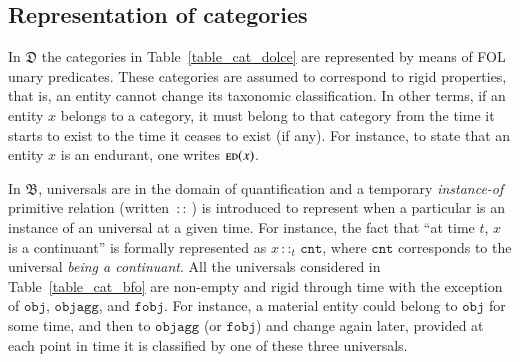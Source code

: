\documentclass[ao]{iosart2x}
\newcommand{\nb}[1]{\textcolor{red}{$|$}\marginpar{\hspace*{-0cm}\parbox{20mm}{\scriptsize\raggedright\textcolor{red}{#1}}}}
\newcommand{\cn}[1]{\mathtt{#1}}
\newcommand {\thdolce} {\ensuremath{\mathfrak{D}}}
\newcommand {\thbfo} {\ensuremath{\mathfrak{B}}}
\newcommand {\EDdcat} {\textsc{ed}}
\newcommand{\cntbcat}{\cn{cnt}}
\newcommand{\objbcat}{\cn{obj}}
\newcommand{\fobjbcat}{\cn{fobj}}
\newcommand{\objaggbcat}{\cn{objagg}}
\newcommand{\bfoiof}[1]{{\,::_{#1\:\!}}}
\begin{document}
\subsection{Representation of categories}\label{sect_problem_univ}

In  {$\thdolce$} the categories in  Table~\ref{table_cat_dolce} are represented by means of FOL unary predicates. These categories are assumed to correspond to rigid properties, that is, an entity cannot change its taxonomic classification. In other terms, if an entity $x$ belongs to a category, it must belong to that category from the time it starts to exist to the time it ceases to exist (if any). For instance, to state that an entity $x$ is an endurant, one writes $\EDdcat(x)$.  

In {$\thbfo$}, universals are in the domain of quantification and a temporary \emph{instance-of} primitive relation (written $\bfoiof{}$) is introduced to represent when a particular is an instance of an universal at a given time. For instance, the fact that ``at time $t$, $x$ is a continuant'' is formally represented as $x \bfoiof{t} \cntbcat$, where $\cntbcat$ corresponds to the universal \emph{being a continuant}.
All the universals considered in Table~\ref{table_cat_bfo} are non-empty and rigid through time %
with the exception of $\objbcat$, $\objaggbcat$, and $\fobjbcat$. For instance, a material entity could belong to $\objbcat$ for some time, and then to $\objaggbcat$ (or $\fobjbcat$) and change again later, provided at each point in time it is classified by one of these three universals.
\end{document}
